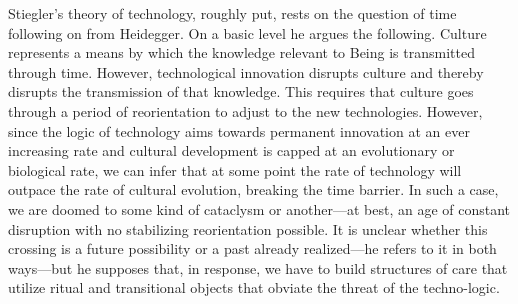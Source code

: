 \documentclass[letterpaper,notitlepage,12pt]{article}
\begin{document}
Stiegler's theory of technology, roughly put, rests on the question of time
following on from Heidegger.
On a basic level he argues the following.
Culture represents a means by which the knowledge relevant to Being is
transmitted through time.
However, technological innovation disrupts culture and thereby disrupts the
transmission of that knowledge.
This requires that culture goes through a period of reorientation to adjust to
the new technologies.
However, since the logic of technology aims towards permanent innovation at an
ever increasing rate and cultural development is capped at an evolutionary or
biological rate, we can infer that at some point the rate of technology will
outpace the rate of cultural evolution, breaking the time barrier. In such a
case, we are doomed to some kind of cataclysm or another---at best, an age of
constant disruption with no stabilizing reorientation possible.
It is unclear whether this crossing is a future possibility or a past already
realized---he refers to it in both ways---but he supposes that, in response, we
have to build structures of care that utilize ritual and transitional objects
that obviate the threat of the techno-logic.
\end{document}

